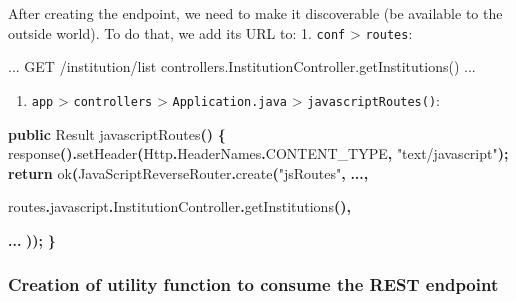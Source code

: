 \documentclass[
  11pt,
]{krantz}
\newenvironment{Shaded}{\begin{snugshade}}{\end{snugshade}}
\newcommand{\BuiltInTok}[1]{#1}
\newcommand{\ControlFlowTok}[1]{\textcolor[rgb]{0.27,0.27,0.27}{\textbf{#1}}}
\newcommand{\FunctionTok}[1]{\textcolor[rgb]{0,0,0}{#1}}
\newcommand{\KeywordTok}[1]{\textcolor[rgb]{0.27,0.27,0.27}{\textbf{#1}}}
\newcommand{\NormalTok}[1]{#1}
\newcommand{\OperatorTok}[1]{\textcolor[rgb]{0.43,0.43,0.43}{\textbf{#1}}}
\newcommand{\StringTok}[1]{\textcolor[rgb]{0.5,0.5,0.5}{#1}}
\providecommand{\tightlist}{%
  \setlength{\itemsep}{0pt}\setlength{\parskip}{0pt}}
\begin{document}
After creating the endpoint, we need to make it discoverable (be available to the outside world). To do that, we add its URL to:
1. \texttt{conf} \textgreater{} \texttt{routes}:

\begin{Shaded}
\begin{Highlighting}[]
\NormalTok{...}
\NormalTok{GET          /institution/list                    controllers.InstitutionController.getInstitutions()}
\NormalTok{...}
\end{Highlighting}
\end{Shaded}

\begin{enumerate}
\def\labelenumi{\arabic{enumi}.}
\setcounter{enumi}{1}
\tightlist
\item
  \texttt{app} \textgreater{} \texttt{controllers} \textgreater{} \texttt{Application.java} \textgreater{} \texttt{javascriptRoutes()}:
\end{enumerate}

\begin{Shaded}
\begin{Highlighting}[]
\KeywordTok{public} \BuiltInTok{Result} \FunctionTok{javascriptRoutes}\OperatorTok{()} \OperatorTok{\{}
    \FunctionTok{response}\OperatorTok{().}\FunctionTok{setHeader}\OperatorTok{(}\NormalTok{Http}\OperatorTok{.}\FunctionTok{HeaderNames}\OperatorTok{.}\FunctionTok{CONTENT\_TYPE}\OperatorTok{,} \StringTok{"text/javascript"}\OperatorTok{);}
    \ControlFlowTok{return} \FunctionTok{ok}\OperatorTok{(}\NormalTok{JavaScriptReverseRouter}\OperatorTok{.}\FunctionTok{create}\OperatorTok{(}\StringTok{"jsRoutes"}\OperatorTok{,}
        \KeywordTok{...}\OperatorTok{,}

\NormalTok{        routes}\OperatorTok{.}\FunctionTok{javascript}\OperatorTok{.}\FunctionTok{InstitutionController}\OperatorTok{.}\FunctionTok{getInstitutions}\OperatorTok{(),}

        \KeywordTok{...}
    \OperatorTok{));}
\OperatorTok{\}}
\end{Highlighting}
\end{Shaded}

\hypertarget{creation-of-utility-function-to-consume-the-rest-endpoint}{%
\subsubsection{Creation of utility function to consume the REST endpoint}\label{creation-of-utility-function-to-consume-the-rest-endpoint}}
\end{document}
